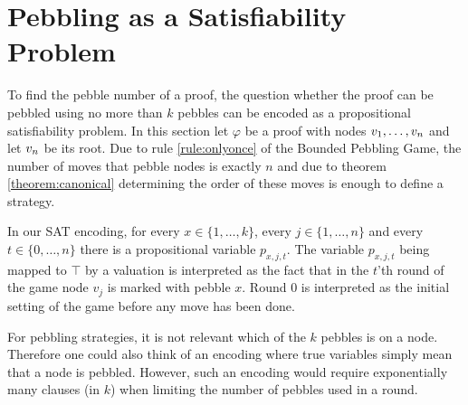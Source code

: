 \section{Pebbling as a Satisfiability Problem}
\label{sec:pebblingSAT}

To find the pebble number of a proof, the question whether the proof can be pebbled using no more than $k$ pebbles can be encoded as a propositional satisfiability problem.
In this section let $\varphi$ be a proof with nodes $v_1,\ldots,v_n$ and let $v_n$ be its root. 
Due to rule \ref{rule:onlyonce} of the Bounded Pebbling Game, the number of moves that pebble nodes is exactly $n$ and due to theorem \ref{theorem:canonical} determining the order of these moves is enough to define a strategy. 

In our SAT encoding, for every $x \in \{1,\ldots,k\}$, every $j \in \{1,\ldots,n\}$ and every $t \in \{0,\ldots,n\}$ there is a propositional variable $p_{x,j,t}$. 
The variable $p_{x,j,t}$ being mapped to $\top$ by a valuation is interpreted as the fact that in the $t$'th round of the game node $v_j$ is marked with pebble $x$.
Round $0$ is interpreted as the initial setting of the game before any move has been done.

For pebbling strategies, it is not relevant which of the $k$ pebbles is on a node.
Therefore one could also think of an encoding where true variables simply mean that a node is pebbled.
However, such an encoding would require exponentially many clauses (in $k$) when limiting the number of pebbles used in a round.

